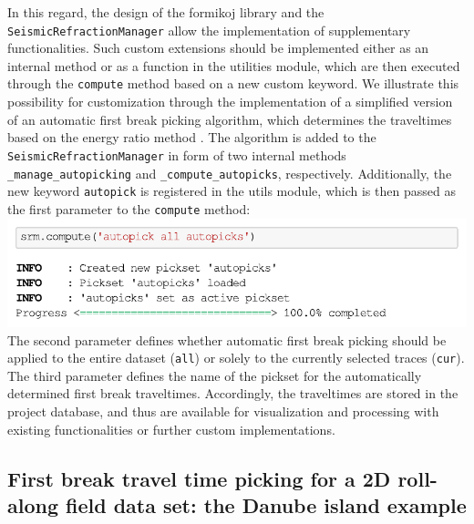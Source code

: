\documentclass[a4paper,fleqn]{cas-sc}
\begin{document}
In this regard, the design of the formikoj library and the \texttt{SeismicRefractionManager} allow the implementation of supplementary functionalities. 
Such custom extensions should be implemented either as an internal method or as a function in the utilities module, which are then executed through the \texttt{compute} method based on a new custom keyword. 
We illustrate this possibility for customization through the implementation of a simplified version of an automatic first break picking algorithm, which determines the traveltimes based on the energy ratio method \citep[e.g.,][]{earle1994}. The algorithm is added to the \texttt{SeismicRefractionManager} in form of two internal methods \texttt{\_manage\_autopicking} and \texttt{\_compute\_autopicks}, respectively. Additionally, the new keyword \texttt{autopick} is registered in the utils module, which is then passed as the first parameter to the \texttt{compute} method:
\newline
\includegraphics[width=.5\textwidth]{./figures/autopicking.pdf}
\newline
The second parameter defines whether automatic first break picking should be applied to the entire dataset (\texttt{all}) or solely to the currently selected traces (\texttt{cur}). The third parameter defines the name of the pickset for the automatically determined first break traveltimes. Accordingly, the traveltimes are stored in the project database, and thus are available for visualization and processing with existing functionalities or further custom implementations.

\subsection{First break travel time picking for a 2D roll-along field data set: the Danube island example}
\end{document}
